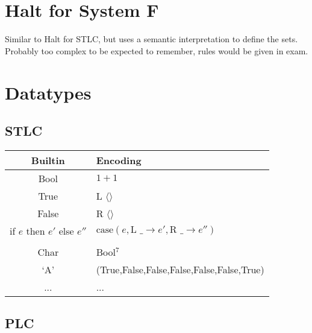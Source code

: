 \documentclass[a4paper,11pt]{article}
\begin{document}
\section{Halt for System F}
{
    Similar to Halt for STLC, but uses a semantic interpretation to define the sets. Probably too complex to be expected
    to remember, rules would be given in exam.
}
\section{Datatypes}
{
    \subsection{STLC}
    {
        \begin{tabular}{c | l}
        Builtin & Encoding \\
        \hline
        Bool & \(1+1\) \\
        True & L \(\langle\rangle\) \\
        False & R \(\langle\rangle\) \\
        if \(e\) then \(e'\) else \(e''\) & \(\text{case}(e,\text{L \_}\rightarrow e',\text{R \_}\rightarrow e'')\) \\
        \\
        Char & Bool\(^7\) \\
        `A' & (True,False,False,False,False,False,True) \\
        ... & ...
        \end{tabular}
    }
    \subsection{PLC}
    {

}}
\end{document}
